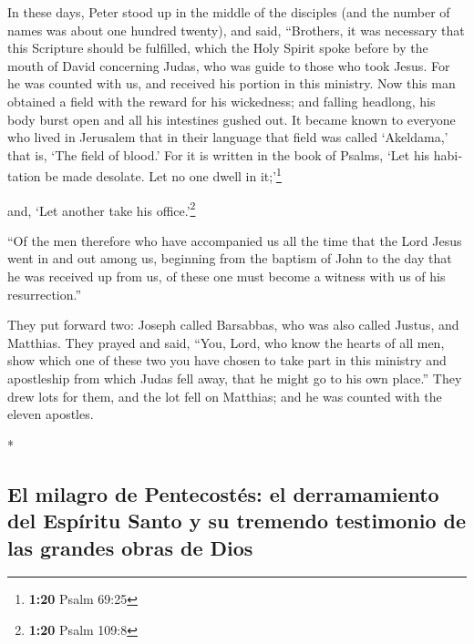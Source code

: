 \begin{paracol}{2}
\begin{otherlanguage}{english}
 In these days, Peter stood up in the middle of the
disciples (and the number of names was about one hundred twenty), and
said,  ``Brothers, it was necessary that this Scripture
should be fulfilled, which the Holy Spirit spoke before by the mouth of
David concerning Judas, who was guide to those who took Jesus.
 For he was counted with us, and received his portion in
this ministry.  Now this man obtained a field with the
reward for his wickedness; and falling headlong, his body burst open and
all his intestines gushed out.  It became known to
everyone who lived in Jerusalem that in their language that field was
called `Akeldama,' that is, `The field of blood.'  For it
is written in the book of Psalms, `Let his habitation be made desolate.
Let no one dwell in it;'\footnote{\textbf{1:20} Psalm 69:25}

and, `Let another take his office.'\footnote{\textbf{1:20} Psalm 109:8}

 ``Of the men therefore who have accompanied us all the
time that the Lord Jesus went in and out among us, 
beginning from the baptism of John to the day that he was received up
from us, of these one must become a witness with us of his
resurrection.''

 They put forward two: Joseph called Barsabbas, who was
also called Justus, and Matthias.  They prayed and said,
``You, Lord, who know the hearts of all men, show which one of these two
you have chosen  to take part in this ministry and
apostleship from which Judas fell away, that he might go to his own
place.''  They drew lots for them, and the lot fell on
Matthias; and he was counted with the eleven apostles.

\end{otherlanguage}

\switchcolumn[0]*

\hypertarget{el-milagro-de-pentecostuxe9s-el-derramamiento-del-espuxedritu-santo-y-su-tremendo-testimonio-de-las-grandes-obras-de-dios}{%
\subsection{El milagro de Pentecostés: el derramamiento del Espíritu
Santo y su tremendo testimonio de las grandes obras de
Dios}\label{el-milagro-de-pentecostuxe9s-el-derramamiento-del-espuxedritu-santo-y-su-tremendo-testimonio-de-las-grandes-obras-de-dios}}


\end{paracol}
